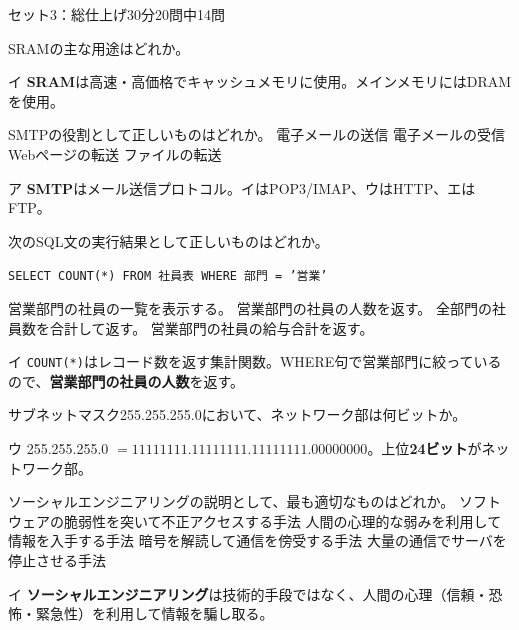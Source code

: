 \begin{mogishi}{セット3：総仕上げ}{30分}{20問中14問}
\begin{itpmon}[\diffbadge{標}]{SRAMの主な用途はどれか。}
\end{itpmon}
\begin{kaisetsu}{イ}
\textbf{SRAM}は高速・高価格でキャッシュメモリに使用。メインメモリにはDRAMを使用。
\end{kaisetsu}

\begin{itpmon}[\diffbadge{標}]{SMTPの役割として正しいものはどれか。}
\sentakushi
  {電子メールの送信}
  {電子メールの受信}
  {Webページの転送}
  {ファイルの転送}
\end{itpmon}
\begin{kaisetsu}{ア}
\textbf{SMTP}はメール送信プロトコル。イはPOP3/IMAP、ウはHTTP、エはFTP。
\end{kaisetsu}

\begin{itpmon}[\diffbadge{強}]{次のSQL文の実行結果として正しいものはどれか。

\texttt{SELECT COUNT(*) FROM 社員表 WHERE 部門 = '営業'}}
\sentakushi
  {営業部門の社員の一覧を表示する。}
  {営業部門の社員の人数を返す。}
  {全部門の社員数を合計して返す。}
  {営業部門の社員の給与合計を返す。}
\end{itpmon}
\begin{kaisetsu}{イ}
\texttt{COUNT(*)}はレコード数を返す集計関数。WHERE句で営業部門に絞っているので、\textbf{営業部門の社員の人数}を返す。
\end{kaisetsu}

\begin{itpmon}[\diffbadge{標}]{サブネットマスク255.255.255.0において、ネットワーク部は何ビットか。}
\end{itpmon}
\begin{kaisetsu}{ウ}
255.255.255.0 $= 11111111.11111111.11111111.00000000$。上位\textbf{24ビット}がネットワーク部。
\end{kaisetsu}

\begin{itpmon}[\diffbadge{標}]{ソーシャルエンジニアリングの説明として、最も適切なものはどれか。}
\sentakushi
  {ソフトウェアの脆弱性を突いて不正アクセスする手法}
  {人間の心理的な弱みを利用して情報を入手する手法}
  {暗号を解読して通信を傍受する手法}
  {大量の通信でサーバを停止させる手法}
\end{itpmon}
\begin{kaisetsu}{イ}
\textbf{ソーシャルエンジニアリング}は技術的手段ではなく、人間の心理（信頼・恐怖・緊急性）を利用して情報を騙し取る。
\end{kaisetsu}


\end{mogishi}
